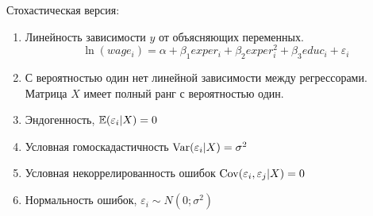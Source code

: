 \documentclass[addpoints, answers]{exam} %
\begin{document}
\begin{questions}
\begin{parts}
\begin{solution}
Стохастическая версия:

\begin{enumerate}
\item Линейность зависимости $y$ от объясняющих переменных. 
\[
\ln(wage_i) = \alpha + \beta_1 exper_i + \beta_2 exper_i^2 + \beta_3 educ_i  + \varepsilon_i
\]
\item С вероятностью один нет линейной зависимости между регрессорами. Матрица $X$ имеет полный ранг с вероятностью один.
\item Эндогенность, $\mathbb{E}(\varepsilon_i | X)=0$
\item Условная гомоскадастичность $\operatorname{Var}(\varepsilon_i |X)=\sigma^2$
\item Условная некоррелированность ошибок $\operatorname{Cov}(\varepsilon_i,\varepsilon_j |X)=0$
\item Нормальность ошибок, $\varepsilon_i \sim N(0;\sigma^2)$
\end{enumerate}

\end{solution}

\end{parts}

\end{questions}
\end{document}
